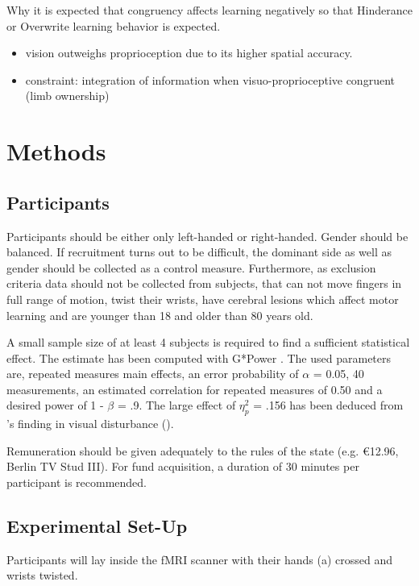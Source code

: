 \documentclass[man]{apa7}
\begin{document}
Why it is expected that congruency affects learning negatively so that Hinderance or Overwrite learning behavior is expected.

\begin{itemize}
    \item vision outweighs proprioception due to its higher spatial accuracy.
    \item constraint: integration of information when visuo-proprioceptive congruent (limb ownership)
\end{itemize}

\parencite{Limanowski2016}


\section{Methods}
\subsection{Participants}

Participants should be either only left-handed or right-handed. Gender should be balanced. If recruitment turns out to be difficult, the dominant side as well as gender should be collected as a control measure. Furthermore, as exclusion criteria data should not be collected from subjects, that can not move fingers in full range of motion, twist their wrists, have cerebral lesions which affect motor learning and are younger than 18 and older than 80 years old.

A small sample size of at least 4 subjects is required to find a sufficient statistical effect. The estimate has been computed with G*Power \parencite{erdfelder1996gpower}. The used parameters are, repeated measures main effects, an error probability of $\alpha$ = 0.05, 40 measurements, an estimated correlation for repeated measures of 0.50 and a desired power of 1 - $\beta$ = .9. The large effect of $\eta^2_p$ = .156 has been deduced from \citeauthor{Wei2009}'s finding in visual disturbance (\citeyear{Wei2009}).

Remuneration should be given adequately to the rules of the state (e.g. €12.96, Berlin TV Stud III). For fund acquisition, a duration of 30 minutes per participant is recommended.

\subsection{Experimental Set-Up}

Participants will lay inside the fMRI scanner with their hands (a) crossed and wrists twisted.
\end{document}
